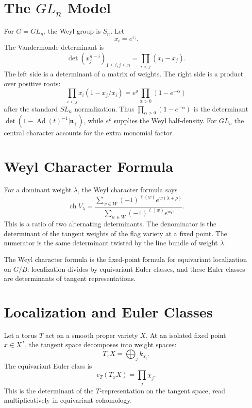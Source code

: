 \documentclass[11pt]{memoir}
\begin{document}
\section{\texorpdfstring{The \(GL_n\) Model}{The GLn Model}}
\label{sec:gln-model}

For \(G=GL_n\), the Weyl group is \(S_n\). Let
\[
  x_i=e^{\varepsilon_i}.
\]
The Vandermonde determinant is
\[
  \det(x_j^{n-i})_{1\leq i,j\leq n}
  =
  \prod_{i<j}(x_i-x_j).
\]
The left side is a determinant of a matrix of weights. The right side
is a product over positive roots:
\[
  \prod_{i<j}x_i(1-x_j/x_i)
  =
  e^\rho\prod_{\alpha>0}(1-e^{-\alpha})
\]
after the standard \(SL_n\) normalization. Thus
\(\prod_{\alpha>0}(1-e^{-\alpha})\) is the determinant
\(\det(1-\operatorname{Ad}(t)^{-1}|\mathfrak n_+)\), while
\(e^\rho\) supplies the Weyl half-density.  For \(GL_n\) the central
character accounts for the extra monomial factor.

\section{Weyl Character Formula}
\label{sec:weyl-character}

For a dominant weight \(\lambda\), the Weyl character formula says
\[
  \operatorname{ch}V_\lambda
  =
  \frac{\sum_{w\in W}(-1)^{\ell(w)}e^{w(\lambda+\rho)}}
  {\sum_{w\in W}(-1)^{\ell(w)}e^{w\rho}}.
\]
This is a ratio of two alternating determinants. The denominator is
the determinant of the tangent weights of the flag variety at a fixed
point. The numerator is the same determinant twisted by the line
bundle of weight \(\lambda\).

The Weyl character formula is the fixed-point formula for equivariant
localization on \(G/B\): localization divides by equivariant Euler
classes, and these Euler classes are determinants of tangent
representations.

\section{Localization and Euler Classes}
\label{sec:localization}

Let a torus \(T\) act on a smooth proper variety \(X\). At an isolated
fixed point \(x\in X^T\), the tangent space decomposes into weight
spaces:
\[
  T_xX=\bigoplus_j k_{\chi_j}.
\]
The equivariant Euler class is
\[
  e_T(T_xX)=\prod_j\chi_j.
\]
This is the determinant of the \(T\)-representation on the tangent
space, read multiplicatively in equivariant cohomology.
\end{document}
